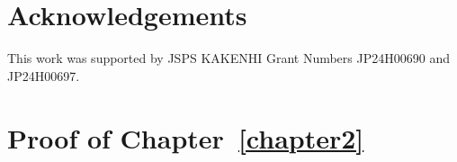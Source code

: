 \documentclass[runningheads]{llncs}
\theoremstyle{plain}
\theoremstyle{definition}
\begin{document}
\section*{Acknowledgements}

This work was supported by JSPS KAKENHI Grant Numbers JP24H00690 and JP24H00697.













%
%
%
\nocite{*}


%



\appendix
\section{Proof of Chapter~\ref{chapter2}}
\end{document}

